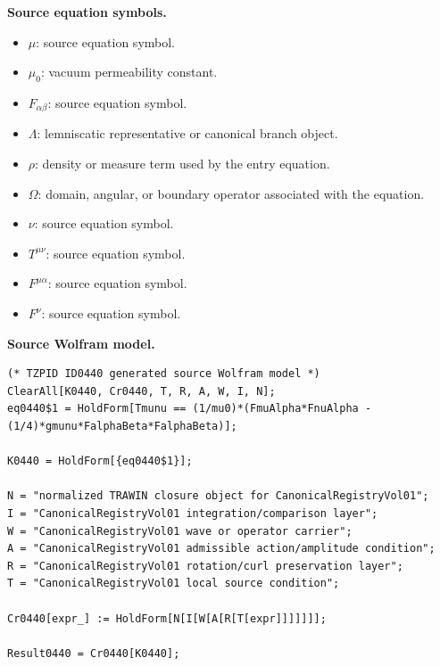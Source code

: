 \begin{minipage}[t]{0.49\linewidth}
\begingroup
\small
\raggedright
\textbf{Source equation symbols.}\par
\begin{itemize}[leftmargin=1.35em,itemsep=1pt,topsep=1pt,parsep=0pt]
    \item $\mu$: source equation symbol.
    \item $\mu_{0}$: vacuum permeability constant.
    \item $F_{\alpha\beta}$: source equation symbol.
    \item $\Lambda$: lemniscatic representative or canonical branch object.
    \item $\rho$: density or measure term used by the entry equation.
    \item $\Omega$: domain, angular, or boundary operator associated with the equation.
    \item $\nu$: source equation symbol.
    \item $T^{\mu\nu}$: source equation symbol.
    \item $F^{\mu\alpha}$: source equation symbol.
    \item $F^{\nu}$: source equation symbol.
\end{itemize}
\endgroup
\end{minipage}\hfill
\begin{minipage}[t]{0.47\linewidth}
\begingroup
\scriptsize
\raggedright
\textbf{Source Wolfram model.}\par
\begin{Verbatim}[fontsize=\tiny,breaklines=true,breakanywhere=true]
(* TZPID ID0440 generated source Wolfram model *)
ClearAll[K0440, Cr0440, T, R, A, W, I, N];
eq0440$1 = HoldForm[Tmunu == (1/mu0)*(FmuAlpha*FnuAlpha - (1/4)*gmunu*FalphaBeta*FalphaBeta)];

K0440 = HoldForm[{eq0440$1}];

N = "normalized TRAWIN closure object for CanonicalRegistryVol01";
I = "CanonicalRegistryVol01 integration/comparison layer";
W = "CanonicalRegistryVol01 wave or operator carrier";
A = "CanonicalRegistryVol01 admissible action/amplitude condition";
R = "CanonicalRegistryVol01 rotation/curl preservation layer";
T = "CanonicalRegistryVol01 local source condition";

Cr0440[expr_] := HoldForm[N[I[W[A[R[T[expr]]]]]]];

Result0440 = Cr0440[K0440];
\end{Verbatim}
\endgroup
\end{minipage}

